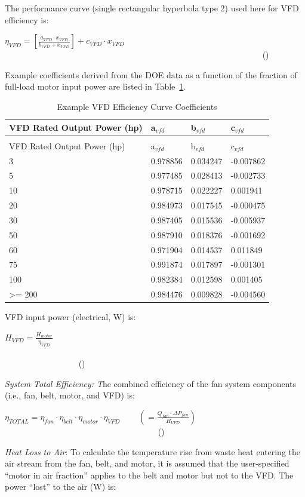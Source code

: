The performance curve (single rectangular hyperbola type 2) used here for VFD efficiency is:

\({\eta_{VFD}} = \left[ {\frac{{{a_{VFD}} \cdot {x_{VFD}}}}{{{b_{VFD}} + {x_{VFD}}}}} \right] + {c_{VFD}} \cdot {x_{VFD}}\) ~~~~~~~~~~~~~~~~~~~~~~~~~~~~~~~~~~~~~~~~~~~~~~~~~~~~~~~~~~~~~ ()

Example coefficients derived from the DOE data as a function of the fraction of full-load motor input power are listed in Table~\ref{table:example-vfd-efficiency-curve-coefficients}.

\begin{longtable}[c]{@{}llll@{}}
\caption{Example VFD Efficiency Curve Coefficients \label{table:example-vfd-efficiency-curve-coefficients}} \tabularnewline
\toprule 
VFD Rated Output Power (hp) & a\(_{vfd}\) & b\(_{vfd}\) & c\(_{vfd}\) \tabularnewline \midrule
\midrule
\endfirsthead

\caption[]{Example VFD Efficiency Curve Coefficients} \tabularnewline
\toprule 
VFD Rated Output Power (hp) & a\(_{vfd}\) & b\(_{vfd}\) & c\(_{vfd}\) \tabularnewline \midrule
\midrule
\endhead

3 & 0.978856 & 0.034247 & -0.007862 \tabularnewline
5 & 0.977485 & 0.028413 & -0.002733 \tabularnewline
10 & 0.978715 & 0.022227 & 0.001941 \tabularnewline
20 & 0.984973 & 0.017545 & -0.000475 \tabularnewline
30 & 0.987405 & 0.015536 & -0.005937 \tabularnewline
50 & 0.987910 & 0.018376 & -0.001692 \tabularnewline
60 & 0.971904 & 0.014537 & 0.011849 \tabularnewline
75 & 0.991874 & 0.017897 & -0.001301 \tabularnewline
100 & 0.982384 & 0.012598 & 0.001405 \tabularnewline
>= 200 & 0.984476 & 0.009828 & -0.004560 \tabularnewline
\bottomrule
\end{longtable}

VFD input power (electrical, W) is:

\({H_{VFD}} = \frac{{{H_{motor}}}}{{{\eta_{VFD}}}}\) ~~~~~~~~~~~~~~~~~~~~~~~~~~~~~~~~~~~~~~~~~~~~~~~~~~~~~~~~~~~~~~~~~~~~~~~~~~~~~~~~~~~~~~~~~ ()

\emph{System Total Efficiency: T}he combined efficiency of the fan system components (i.e., fan, belt, motor, and VFD) is:

\({\eta_{TOTAL}} = {\eta_{fan}} \cdot {\eta_{belt}} \cdot {\eta_{motor}} \cdot {\eta_{VFD}}\) ~~~ \(\left( { = \frac{{{Q_{fan}} \cdot \Delta {P_{fan}}}}{{{H_{VFD}}}}} \right)\) ~~~~~~~~~~~~~~~~~~~~~~~~~~~~~~~~~~~~ ()

\emph{Heat Loss to Air}: To calculate the temperature rise from waste heat entering the air stream from the fan, belt, and motor, it is assumed that the user-specified ``motor in air fraction'' applies to the belt and motor but not to the VFD. The power ``lost'' to the air (W) is:

